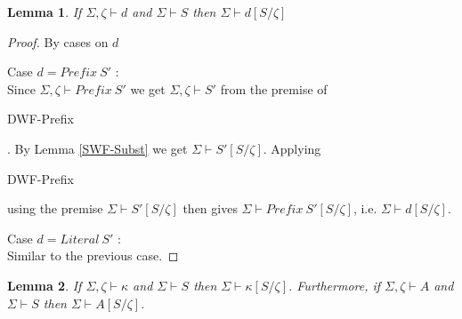 \documentclass{article}
\newtheorem{lemma}{Lemma}
\begin{document}
\begin{lemma}
If $\Sigma,\zeta \vdash d$ and $\Sigma \vdash S$ then $\Sigma \vdash d[S/\zeta]$
\label{DWF-Subst}
\end{lemma}

\begin{proof}
By cases on $d$

\item[Case $d = \mathit{Prefix}~S'$]:\\
Since $\Sigma,\zeta \vdash \mathit{Prefix}~S'$ we get $\Sigma,\zeta \vdash S'$ from the premise of 
\begin{sc}DWF-Prefix\end{sc}. By Lemma \ref{SWF-Subst} we get $\Sigma \vdash S'[S/\zeta]$. Applying
\begin{sc}DWF-Prefix\end{sc} using the premise $\Sigma \vdash S'[S/\zeta]$ then gives $\Sigma \vdash \mathit{Prefix}~S'[S/\zeta]$, i.e. $\Sigma \vdash d[S/\zeta]$.

\item[Case $d = \mathit{Literal}~S'$]:\\
Similar to the previous case.

\end{proof}

\begin{lemma}
If $\Sigma,\zeta \vdash \kappa$ and $\Sigma \vdash S$ then $\Sigma \vdash \kappa[S/\zeta]$.
Furthermore, if $\Sigma,\zeta \vdash A$ and $\Sigma \vdash S$ then $\Sigma \vdash A[S/\zeta]$.
\end{lemma}
\end{document}
